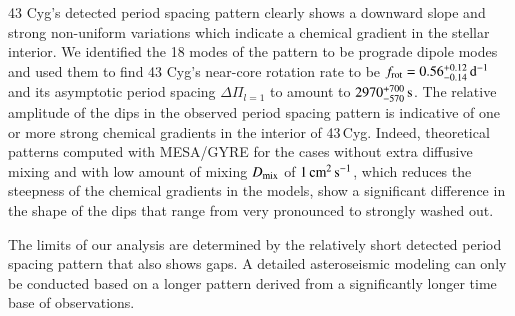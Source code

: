 \documentclass{aa}
\begin{document}
43 Cyg's detected period spacing pattern clearly shows a downward slope and strong non-uniform variations which indicate a chemical gradient in the stellar interior. We identified the 18 modes of the pattern to be prograde dipole modes and used them to find 43 Cyg's near-core rotation rate to be $f_{\rm rot} = 0.56^{+0.12}_{-0.14}\,\rm d^{-1}$ and its asymptotic period spacing $\Delta \Pi_{l=1}$ to amount to $2970^{+700}_{-570}\,\rm s$. 
The relative amplitude of the dips in the observed period spacing pattern is indicative of one or more strong chemical gradients in the interior of 43\,Cyg. Indeed, theoretical patterns computed with MESA/GYRE for the cases without extra diffusive mixing and with low amount of mixing $D_{\rm mix}$ of $1\,\rm cm^2\,s^{-1}$, which reduces the steepness of the chemical gradients in the models, show a significant difference in the shape of the dips that range from very pronounced to strongly washed out.

The limits of our analysis are determined by the relatively short detected period spacing pattern that also shows gaps. A detailed asteroseismic modeling can only be conducted based on a longer pattern derived from a significantly longer time base of observations. 
\end{document}
